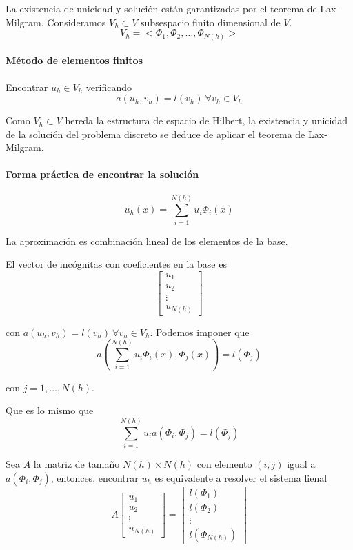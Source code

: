     La existencia de unicidad y solución están garantizadas por el teorema de Lax-Milgram. Consideramos $V_h\subset V$ subsespacio finito dimensional de $V$.
    $$V_h = <\Phi_1, \Phi_2, \hdots, \Phi_{N(h)}>$$
    
    \paragraph{Método de elementos finitos}
    Encontrar $u_h\in V_h$ verificando 
    $$a(u_h, v_h) = l(v_h) \ \forall v_h \in V_h$$
    
    Como $V_h\subset V$ hereda la estructura de espacio de Hilbert, la existencia y unicidad de la solución del problema discreto se deduce de aplicar el teorema de Lax-Milgram.
    
    \paragraph{Forma práctica de encontrar la solución}
    $$u_h(x) = \sum_{i=1}^{N(h)} u_i \Phi_i(x)$$
    
    La aproximación es combinación lineal de los elementos de la base.
    
    El vector de incógnitas con coeficientes en la base es
    $$\begin{bmatrix}
    	u_1\\u_2\\\vdots\\ u_{N(h)}
    \end{bmatrix}$$
    
    con $a(u_h, v_h) = l(v_h) \ \forall v_h\in V_h$. 
    Podemos imponer que
    $$a(\sum_{i=1}^{N(h)} u_i \Phi_i(x), \Phi_j(x)) = l(\Phi_j)$$
    
    con $j=1,\hdots, N(h)$.
    
    Que es lo mismo que 
	$$\sum_{i=1}^{N(h)} u_i a(\Phi_i, \Phi_j) = l(\Phi_j)$$
	
	Sea $A$ la matriz de tamaño $N(h) \times N(h)$ con elemento $(i,j)$ igual a $a(\Phi_i, \Phi_j)$, entonces, encontrar $u_h$ es equivalente a resolver el sistema lienal
	$$
	A
	\begin{bmatrix}
	u_1\\u_2\\\vdots\\u_{N(h)}
	\end{bmatrix} = 
	\begin{bmatrix}
	l(\Phi_1)\\
	l(\Phi_2)\\
	\vdots\\
	l(\Phi_{N(h)})
	\end{bmatrix}$$
	
